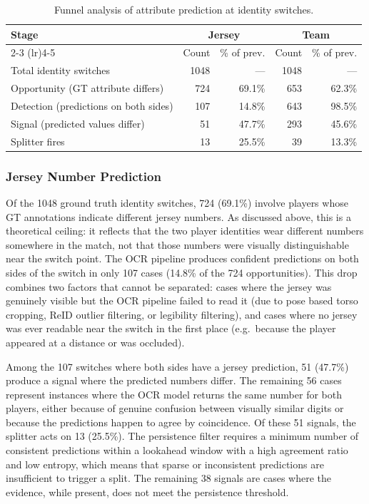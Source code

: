 \begin{table}[ht]
\centering
\caption{Funnel analysis of attribute prediction at identity switches.}
\label{tab:funnel-analysis}
\begin{tabular}{lrrrr}
\toprule
\textbf{Stage} & \multicolumn{2}{c}{\textbf{Jersey}} & \multicolumn{2}{c}{\textbf{Team}} \\
\cmidrule(lr){2-3} \cmidrule(lr){4-5}
 & Count & \% of prev. & Count & \% of prev. \\
\midrule
Total identity switches & 1048 & --- & 1048 & --- \\
Opportunity (GT attribute differs) & 724 & 69.1\% & 653 & 62.3\% \\
Detection (predictions on both sides) & 107 & 14.8\% & 643 & 98.5\% \\
Signal (predicted values differ) & 51 & 47.7\% & 293 & 45.6\% \\
Splitter fires & 13 & 25.5\% & 39 & 13.3\% \\
\bottomrule
\end{tabular}
\end{table}

\subsubsection{Jersey Number Prediction}

Of the 1048 ground truth identity switches, 724 (69.1\%) involve players whose GT annotations indicate different jersey numbers. As discussed above, this is a theoretical ceiling: it reflects that the two player identities wear different numbers somewhere in the match, not that those numbers were visually distinguishable near the switch point. The OCR pipeline produces confident predictions on both sides of the switch in only 107 cases (14.8\% of the 724 opportunities). This drop combines two factors that cannot be separated: cases where the jersey was genuinely visible but the OCR pipeline failed to read it (due to pose based torso cropping, ReID outlier filtering, or legibility filtering), and cases where no jersey was ever readable near the switch in the first place (e.g.\ because the player appeared at a distance or was occluded).

Among the 107 switches where both sides have a jersey prediction, 51 (47.7\%) produce a signal where the predicted numbers differ. The remaining 56 cases represent instances where the OCR model returns the same number for both players, either because of genuine confusion between visually similar digits or because the predictions happen to agree by coincidence. Of these 51 signals, the splitter acts on 13 (25.5\%). The persistence filter requires a minimum number of consistent predictions within a lookahead window with a high agreement ratio and low entropy, which means that sparse or inconsistent predictions are insufficient to trigger a split. The remaining 38 signals are cases where the evidence, while present, does not meet the persistence threshold.

